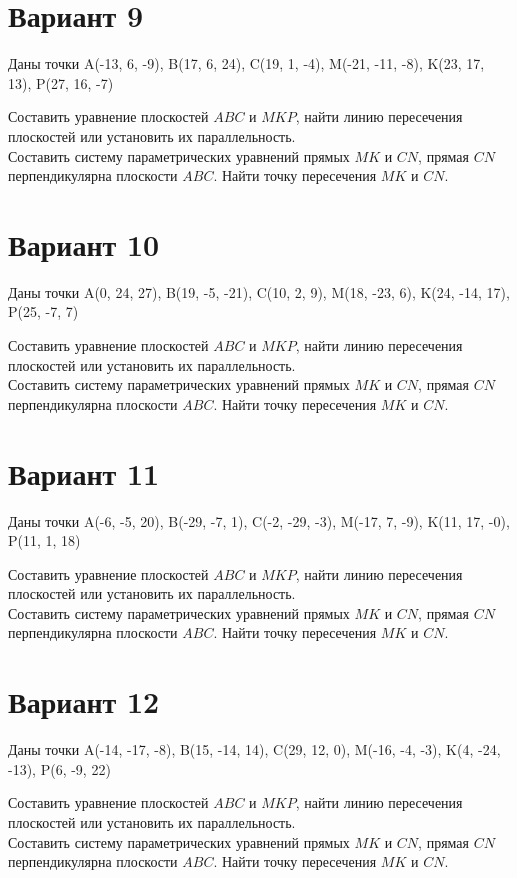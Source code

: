 \documentclass[11pt]{article}
\begin{document}
\section*{Вариант 9}
Даны точки A(-13, 6, -9), B(17, 6, 24), C(19, 1, -4), M(-21, -11, -8), K(23, 17, 13), P(27, 16, -7)

Составить уравнение плоскостей $ABC$ и $MKP$, найти линию пересечения плоскостей или установить их параллельность.\\
Составить систему параметрических уравнений прямых $MK$ и $CN$, прямая $CN$ перпендикулярна плоскости $ABC$. Найти точку пересечения $MK$ и $CN$.

\section*{Вариант 10}
Даны точки A(0, 24, 27), B(19, -5, -21), C(10, 2, 9), M(18, -23, 6), K(24, -14, 17), P(25, -7, 7)

Составить уравнение плоскостей $ABC$ и $MKP$, найти линию пересечения плоскостей или установить их параллельность.\\
Составить систему параметрических уравнений прямых $MK$ и $CN$, прямая $CN$ перпендикулярна плоскости $ABC$. Найти точку пересечения $MK$ и $CN$.

\section*{Вариант 11}
Даны точки A(-6, -5, 20), B(-29, -7, 1), C(-2, -29, -3), M(-17, 7, -9), K(11, 17, -0), P(11, 1, 18)

Составить уравнение плоскостей $ABC$ и $MKP$, найти линию пересечения плоскостей или установить их параллельность.\\
Составить систему параметрических уравнений прямых $MK$ и $CN$, прямая $CN$ перпендикулярна плоскости $ABC$. Найти точку пересечения $MK$ и $CN$.

\section*{Вариант 12}
Даны точки A(-14, -17, -8), B(15, -14, 14), C(29, 12, 0), M(-16, -4, -3), K(4, -24, -13), P(6, -9, 22)

Составить уравнение плоскостей $ABC$ и $MKP$, найти линию пересечения плоскостей или установить их параллельность.\\
Составить систему параметрических уравнений прямых $MK$ и $CN$, прямая $CN$ перпендикулярна плоскости $ABC$. Найти точку пересечения $MK$ и $CN$.
\end{document}
